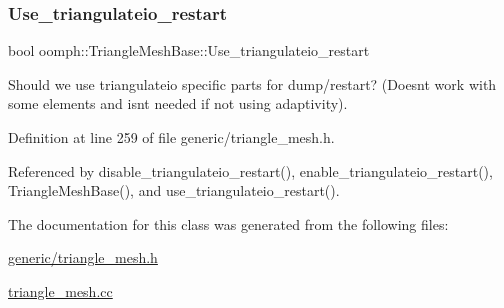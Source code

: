 \mbox{\label{classoomph_1_1TriangleMeshBase_a503839a1350bee25717570fbf504a2e1}} 
\subsubsection{\texorpdfstring{Use\+\_\+triangulateio\+\_\+restart}{Use\_triangulateio\_restart}}
{\footnotesize\ttfamily bool oomph\+::\+Triangle\+Mesh\+Base\+::\+Use\+\_\+triangulateio\+\_\+restart\hspace{0.3cm}{\ttfamily [protected]}}

Should we use triangulateio specific parts for dump/restart? (Doesn\textquotesingle{}t work with some elements and isn\textquotesingle{}t needed if not using adaptivity). 

Definition at line 259 of file generic/triangle\+\_\+mesh.\+h.



Referenced by disable\+\_\+triangulateio\+\_\+restart(), enable\+\_\+triangulateio\+\_\+restart(), Triangle\+Mesh\+Base(), and use\+\_\+triangulateio\+\_\+restart().



The documentation for this class was generated from the following files\+:\begin{DoxyCompactItemize}
\item 
\hyperlink{generic_2triangle__mesh_8h}{generic/triangle\+\_\+mesh.\+h}\item 
\hyperlink{triangle__mesh_8cc}{triangle\+\_\+mesh.\+cc}\end{DoxyCompactItemize}
